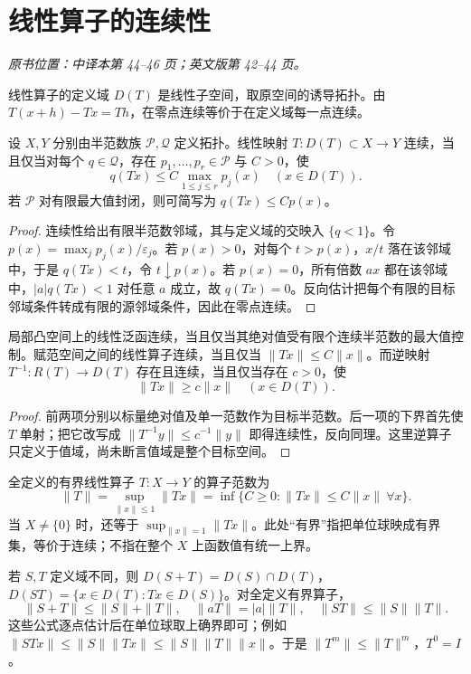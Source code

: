 \section{线性算子的连续性}\label{sec:yosida-01-06}
\noindent\textit{原书位置：中译本第 44--46 页；英文版第 42--44 页。}

线性算子的定义域 $D(T)$ 是线性子空间，取原空间的诱导拓扑。由 $T(x+h)-Tx=Th$，在零点连续等价于在定义域每一点连续。

\begin{theorem}[连续线性算子的半范数估计]\label{thm:y1-operator-seminorm}
设 $X,Y$ 分别由半范数族 $\mathcal P,\mathcal Q$ 定义拓扑。线性映射 $T:D(T)\subset X\to Y$ 连续，当且仅当对每个 $q\in\mathcal Q$，存在 $p_1,\ldots,p_r\in\mathcal P$ 与 $C>0$，使
\[
 q(Tx)\le C\max_{1\le j\le r}p_j(x)\quad(x\in D(T)).
\]
若 $\mathcal P$ 对有限最大值封闭，则可简写为 $q(Tx)\le Cp(x)$。
\end{theorem}
\begin{proof}
连续性给出有限半范数邻域，其与定义域的交映入 $\{q<1\}$。令 $p(x)=\max_jp_j(x)/\varepsilon_j$。若 $p(x)>0$，对每个 $t>p(x)$，$x/t$ 落在该邻域中，于是 $q(Tx)<t$，令 $t\downarrow p(x)$。若 $p(x)=0$，所有倍数 $ax$ 都在该邻域中，$|a|q(Tx)<1$ 对任意 $a$ 成立，故 $q(Tx)=0$。反向估计把每个有限的目标邻域条件转成有限的源邻域条件，因此在零点连续。
\end{proof}
\begin{corollary}
局部凸空间上的线性泛函连续，当且仅当其绝对值受有限个连续半范数的最大值控制。赋范空间之间的线性算子连续，当且仅当 $\|Tx\|\le C\|x\|$。而逆映射 $T^{-1}:R(T)\to D(T)$ 存在且连续，当且仅当存在 $c>0$，使
\[
 \|Tx\|\ge c\|x\|\quad(x\in D(T)).
\]
\end{corollary}
\begin{proof}
前两项分别以标量绝对值及单一范数作为目标半范数。后一项的下界首先使 $T$ 单射；把它改写成 $\|T^{-1}y\|\le c^{-1}\|y\|$ 即得连续性，反向同理。这里逆算子只定义于值域，尚未断言值域是整个目标空间。
\end{proof}

\begin{definition}[算子范数]
全定义的有界线性算子 $T:X\to Y$ 的算子范数为
\[
 \|T\|=\sup_{\|x\|\le1}\|Tx\|
 =\inf\{C\ge0:\|Tx\|\le C\|x\|\ \forall x\}.
\]
当 $X\ne\{0\}$ 时，还等于 $\sup_{\|x\|=1}\|Tx\|$。此处“有界”指把单位球映成有界集，等价于连续；不指在整个 $X$ 上函数值有统一上界。
\end{definition}
若 $S,T$ 定义域不同，则 $D(S+T)=D(S)\cap D(T)$，$D(ST)=\{x\in D(T):Tx\in D(S)\}$。对全定义有界算子，
\[
 \|S+T\|\le\|S\|+\|T\|,\quad
 \|aT\|=|a|\|T\|,\quad \|ST\|\le\|S\|\|T\|.
\]
这些公式逐点估计后在单位球取上确界即可；例如 $\|STx\|\le\|S\|\|Tx\|\le\|S\|\|T\|\|x\|$。于是 $\|T^m\|\le\|T\|^m$，$T^0=I$。

